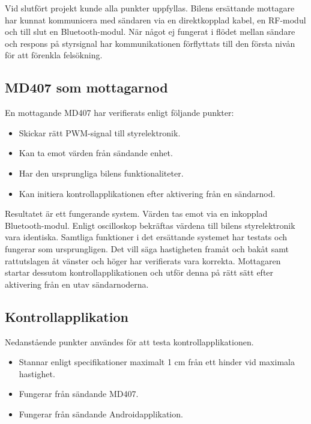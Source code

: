 \documentclass[a4paper]{article}
\begin{document}
\noindent
Vid slutfört projekt kunde alla punkter uppfyllas. Bilens ersättande mottagare har kunnat kommunicera med sändaren via en direktkopplad kabel, en RF-modul och till slut en Bluetooth-modul. När något ej fungerat i flödet mellan sändare och respons på styrsignal har kommunikationen förflyttats till den första nivån för att förenkla felsökning.

\subsection{MD407 som mottagarnod}
En mottagande MD407 har verifierats enligt följande punkter:

\begin{itemize}
\item Skickar rätt PWM-signal till styrelektronik.
\item Kan ta emot värden från sändande enhet.
\item Har den ursprungliga bilens funktionaliteter.
\item Kan initiera kontrollapplikationen efter aktivering från en sändarnod.
\end{itemize}

\noindent
Resultatet är ett fungerande system. Värden tas emot via en inkopplad Bluetooth-modul. Enligt oscilloskop bekräftas värdena till bilens styrelektronik vara identiska. Samtliga funktioner i det ersättande systemet har testats och fungerar som ursprungligen. Det vill säga hastigheten framåt och bakåt samt rattutslagen åt vänster och höger har verifierats vara korrekta. Mottagaren startar dessutom kontrollapplikationen och utför denna på rätt sätt efter aktivering från en utav sändarnoderna.




\subsection{Kontrollapplikation}
Nedanstående punkter användes för att testa kontrollapplikationen.

\begin{itemize}
\item Stannar enligt specifikationer maximalt 1 cm från ett hinder vid maximala hastighet.
\item Fungerar från sändande MD407.
\item Fungerar från sändande Androidapplikation.
\end{itemize}

\end{document}
